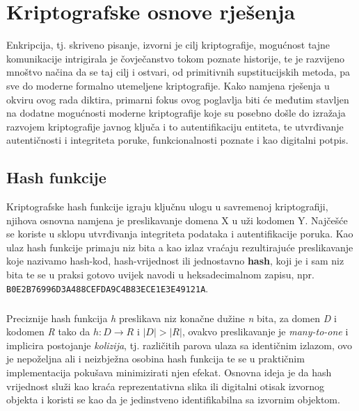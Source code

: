 \chapter{Kriptografske osnove rješenja} \label{chapter:crypto}
Enkripcija, tj. skriveno pisanje, izvorni je cilj kriptografije\cite{ferguson2011cryptography}, mogućnost tajne komunikacije intrigirala je čovječanstvo tokom poznate historije, te je razvijeno mnoštvo načina da se taj cilj i ostvari, od primitivnih supstitucijskih metoda, pa sve do moderne formalno utemeljene kriptografije\cite{singh2000code}. Kako namjena rješenja u okviru ovog rada diktira, primarni fokus ovog poglavlja biti će međutim stavljen na dodatne mogućnosti moderne kriptografije koje su posebno došle do izražaja razvojem kriptografije javnog ključa i to autentifikaciju entiteta, te utvrđivanje autentičnosti i integriteta poruke, funkcionalnosti poznate i kao digitalni potpis.

\section{Hash funkcije}
Kriptografske hash funkcije igraju ključnu ulogu u savremenoj kriptografiji, njihova osnovna namjena je preslikavanje domena X u uži kodomen Y. Najčešće se koriste u sklopu utvrđivanja integriteta podataka i autentifikacije poruka. Kao ulaz hash funkcije primaju niz bita a kao izlaz vraćaju rezultirajuće preslikavanje koje nazivamo hash-kod, hash-vrijednost ili jednostavno \textbf{hash}\cite{katz1996handbook}, koji je i sam niz bita te se u praksi gotovo uvijek navodi u heksadecimalnom zapisu, npr. \texttt{B0E2B76996D3A488CEFDA9C4B83ECE1E3E49121A}.

\paragraph*{}
Preciznije hash funkcija \textit{h} preslikava niz konačne dužine \textit{n} bita, za domen \textit{D} i kodomen \textit{R} tako da \(h: D \to R\) i \(|D|>|R|\), ovakvo preslikavanje je \textit{many-to-one} i implicira postojanje \textit{kolizija}, tj. različitih parova ulaza sa identičnim izlazom, ovo je nepoželjna ali i neizbježna osobina hash funkcija te se u praktičnim implementacija pokušava minimizirati njen efekat. Osnovna ideja je da hash vrijednost služi kao kraća reprezentativna slika ili digitalni otisak izvornog objekta i koristi se kao da je jedinstveno identifikabilna sa izvornim objektom.

